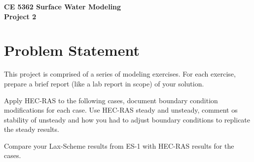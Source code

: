 \documentclass[12pt]{article}
\begin{document}
\begin{center}
{\textbf{{ CE 5362 Surface Water Modeling} \\ {Project 2}}}
\end{center}

\section*{{Problem Statement}}
This project is comprised of a series of modeling exercises.
For each exercise, prepare a brief report (like a lab report in scope) of your solution.  

Apply HEC-RAS to the following cases, document boundary condition modifications for each case.  Use HEC-RAS steady and unsteady, comment os stability of unsteady and how you had to adjust boundary conditions to replicate the steady results.

Compare your Lax-Scheme results from ES-1 with HEC-RAS results for the cases.
\end{document}
